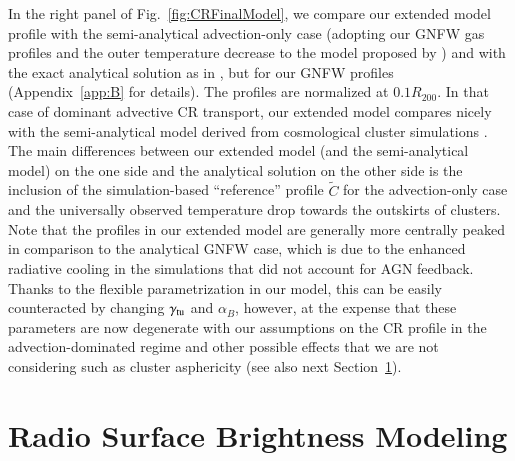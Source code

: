 \documentclass[useAMS,usenatbib]{mn2e}
\begin{document}
In the right panel of Fig.~\ref{fig:CRFinalModel}, we compare our extended model
profile with the semi-analytical advection-only case (adopting our GNFW gas
profiles and the outer temperature decrease to the model proposed by
\citealp{2010MNRAS.409..449P}) and with the exact analytical solution as in
\citet{2011A&A...527A..99E}, but for our GNFW profiles (Appendix~\ref{app:B}
for details).  The profiles are normalized at $0.1 R_{200}$. In that case of
dominant advective CR transport, our extended model compares nicely with the
semi-analytical model derived from cosmological cluster simulations
\citep{2010MNRAS.409..449P}.  The main differences between our extended model (and
the semi-analytical model) on the one side and the analytical solution on the
other side is the inclusion of the simulation-based ``reference'' profile
$\tilde{C}$ for the advection-only case and the universally observed temperature
drop towards the outskirts of clusters. Note that the profiles in our extended
model are generally more centrally peaked in comparison to the analytical GNFW
case, which is due to the enhanced radiative cooling in the
\citet{2010MNRAS.409..449P} simulations that did not account for AGN
feedback. Thanks to the flexible parametrization in our model, this can be
easily counteracted by changing $\gamma_{{\mathrm{tu}}}$ and $\alpha_B$, however, at
the expense that these parameters are now degenerate with our assumptions on the
CR profile in the advection-dominated regime and other possible effects that we
are not considering such as cluster asphericity (see also next
Section~\ref{sec:3}).


\section{Radio Surface Brightness Modeling}
\label{sec:3}
\end{document}
